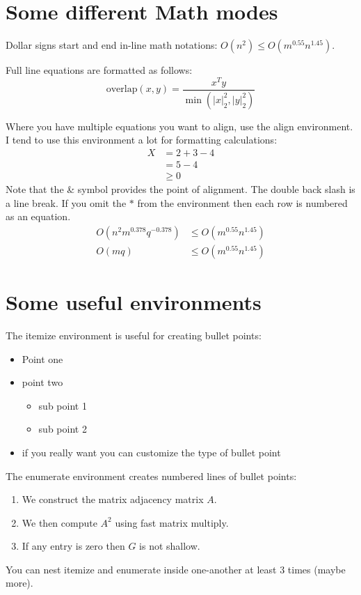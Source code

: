 \documentclass[a4paper,11pt]{article}
\begin{document}
\section{Some different Math modes}

Dollar signs start and end in-line math notations: $O(n^2) \leq O(m^{0.55} n^{1.45})$.

Full line equations are formatted as follows:
\[
\text{overlap}(x,y) = \frac{x^T y}{\min ( |x|_2^2 , |y|_2^2 )}
\]

Where you have multiple equations you want to align, use the align environment. I tend to use this environment a lot for formatting calculations:
\begin{align*}
X &= 2 + 3 - 4 \\
%
&= 5 - 4 \\
%
&\geq 0
\end{align*}
Note that the \& symbol provides the point of alignment. The double back slash is a line break. If you omit the $*$ from the environment then each row is numbered as an equation.
\begin{align}
O(n^2 m^{0.378} q^{-0.378}) &\leq O(m^{0.55} n^{1.45}) \\
%
O(mq) &\leq O(m^{0.55} n^{1.45})
\end{align}

\section{Some useful environments}

The itemize environment is useful for creating bullet points:
\begin{itemize}
\item Point one
\item point two
\begin{itemize}
\item sub point 1
\item sub point 2
\end{itemize}
\item if you really want you can customize the type of bullet point
\end{itemize}

The enumerate environment creates numbered lines of bullet points:
\begin{enumerate}
\item We construct the matrix adjacency matrix $A$.
\item We then compute $A^2$ using fast matrix multiply.
\item If any entry is zero then $G$ is not shallow.
\end{enumerate}
You can nest itemize and enumerate inside one-another at least 3 times (maybe more).
\end{document}
